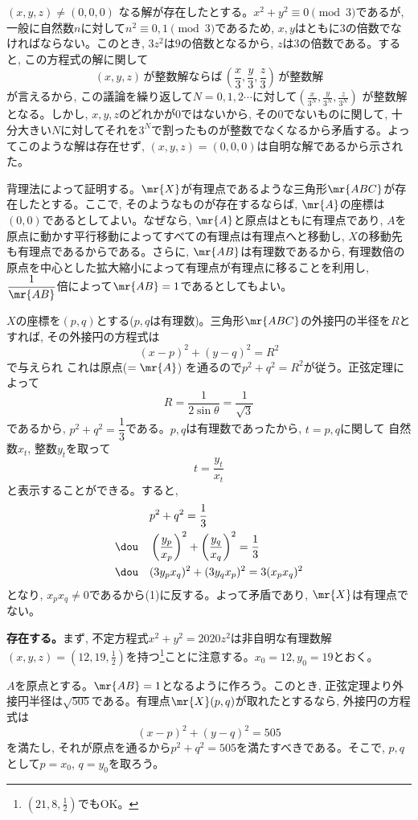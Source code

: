 $(x,y,z) \neq (0,0,0)$ なる解が存在したとする。$x^2 + y^2\equiv 0\pmod{3}$であるが, 一般に自然数$n$に対して$n^2\equiv 0,1\pmod{3}$であるため, $x,y$はともに$3$の倍数でなければならない。このとき, $3z^2$は$9$の倍数となるから, $z$は$3$の倍数である。すると, この方程式の解に関して
\[(x,y,z) \,\text{が整数解ならば} \,\left(\frac{x}{3}, \frac{y}{3}, \frac{z}{3}\right) \,\text{が整数解} \]
が言えるから, この議論を繰り返して$N=0,1,2\cdots$に対して$(\frac{x}{3^{N}}, \frac{y}{3^{N}}, \frac{z}{3^{N}})$ が整数解となる。しかし, $x,y,z$のどれかが$0$ではないから, その$0$でないものに関して, 十分大きい$N$に対してそれを$3^{N}$で割ったものが整数でなくなるから矛盾する。よってこのような解は存在せず, $(x,y,z) = (0,0,0)$は自明な解であるから示された。

背理法によって証明する。$\mr{X}$が有理点であるような三角形$\mr{ABC}$が存在したとする。ここで, そのようなものが存在するならば, $\mr{A}$の座標は$(0,0)$であるとしてよい。なぜなら, $\mr{A}$と原点はともに有理点であり, $A$を原点に動かす平行移動によってすべての有理点は有理点へと移動し, $X$の移動先も有理点であるからである。さらに, $\mr{AB}$は有理数であるから, 有理数倍の原点を中心とした拡大縮小によって有理点が有理点に移ることを利用し, $\dfrac{1}{\mr{AB}}$倍によって$\mr{AB}=1$であるとしてもよい。

$X$の座標を$(p,q)$とする($p,q$は有理数)。三角形$\mr{ABC}$の外接円の半径を$R$とすれば, その外接円の方程式は
\[(x-p)^2 + (y-q)^2 = R^2\]
で与えられ これは原点($=\mr{A}$) を通るので$p^2 + q^2 = R^2$が従う。正弦定理によって
\[R = \dfrac{1}{2\sin{\theta}} = \dfrac{1}{\sqrt{3}}\]
であるから, $p^2 + q^2 = \dfrac{1}{3}$である。$p,q$は有理数であったから, $t=p,q$に関して 自然数$x_t$, 整数$y_t$を取って
\[t = \dfrac{y_t}{x_t}\]
と表示することができる。すると, 
\begin{align*}
 & p^2+q^2 = \dfrac{1}{3} \\
 \dou\quad & \left(\frac{y_p}{x_p}\right)^2 + \left(\frac{y_q}{x_q}\right)^2 = \dfrac{1}{3}\\
 \dou\quad & (3y_px_q)^2 + (3y_qx_p)^2 = 3(x_px_q)^2
\end{align*}
となり, $x_px_q \neq 0$であるから(1)に反する。よって矛盾であり, $\mr{X}$は有理点でない。

{\bf 存在する。}まず, 不定方程式$x^2 + y^2 = 2020z^2$は非自明な有理数解$(x,y,z) = (12,19,\frac{1}{2})$を持つ\footnote{$(21,8,\frac{1}{2})$でもOK。}ことに注意する。$x_0=12, y_0=19$とおく。

$A$を原点とする。$\mr{AB} = 1$となるように作ろう。このとき, 正弦定理より外接円半径は$\sqrt{505}$である。有理点$\mr{X}(p,q)$が取れたとするなら, 外接円の方程式は
\[(x-p)^2 + (y-q)^2 = 505\]
を満たし, それが原点を通るから$p^2 + q^2 = 505$を満たすべきである。そこで, $p,q$として$p=x_0$, $q=y_0$を取ろう。

